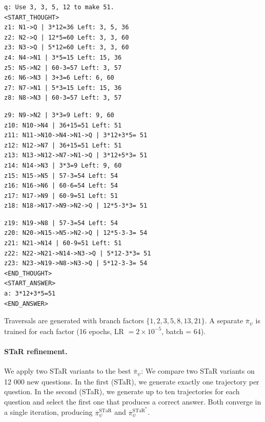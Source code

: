 \documentclass{article}
\begin{document}
\noindent
\begin{minipage}[t]{0.3\textwidth}
\scriptsize{
\begin{verbatim}
q: Use 3, 3, 5, 12 to make 51.
<START_THOUGHT>
z1: N1->Q | 3*12=36 Left: 3, 5, 36
z2: N2->Q | 12*5=60 Left: 3, 3, 60
z3: N3->Q | 5*12=60 Left: 3, 3, 60
z4: N4->N1 | 3*5=15 Left: 15, 36
z5: N5->N2 | 60-3=57 Left: 3, 57
z6: N6->N3 | 3+3=6 Left: 6, 60
z7: N7->N1 | 5*3=15 Left: 15, 36
z8: N8->N3 | 60-3=57 Left: 3, 57
\end{verbatim}}
\end{minipage}
\hfill
\begin{minipage}[t]{0.34\textwidth}
\scriptsize{
\begin{verbatim}
z9: N9->N2 | 3*3=9 Left: 9, 60
z10: N10->N4 | 36+15=51 Left: 51
z11: N11->N10->N4->N1->Q | 3*12+3*5= 51
z12: N12->N7 | 36+15=51 Left: 51
z13: N13->N12->N7->N1->Q | 3*12+5*3= 51
z14: N14->N3 | 3*3=9 Left: 9, 60
z15: N15->N5 | 57-3=54 Left: 54
z16: N16->N6 | 60-6=54 Left: 54
z17: N17->N9 | 60-9=51 Left: 51
z18: N18->N17->N9->N2->Q | 12*5-3*3= 51
\end{verbatim}}
\end{minipage}
\hfill
\begin{minipage}[t]{0.3\textwidth}
\scriptsize{
\begin{verbatim}
z19: N19->N8 | 57-3=54 Left: 54
z20: N20->N15->N5->N2->Q | 12*5-3-3= 54
z21: N21->N14 | 60-9=51 Left: 51
z22: N22->N21->N14->N3->Q | 5*12-3*3= 51
z23: N23->N19->N8->N3->Q | 5*12-3-3= 54
<END_THOUGHT>
<START_ANSWER>
a: 3*12+3*5=51
<END_ANSWER>
\end{verbatim}}
\end{minipage}
\newline

Traversals are generated with branch factors
$\{1,2,3,5,8,13,21\}$.
A separate $\overline{\pi}_\psi$ is trained for each
factor (16 epochs, LR $=2\!\times\!10^{-5}$, batch = 64).

\paragraph{STaR refinement.}
We apply two STaR variants to the best
$\overline{\pi}_\psi$:
We compare two STaR variants on 12 000 new questions. In the first (STaR), we generate exactly one trajectory per question. In the second (STaR\*), we generate up to ten trajectories for each question and select the first one that produces a correct answer. Both converge in a single iteration, producing
$\overline{\pi}_\psi^{\text{STaR}}$ and
$\overline{\pi}_\psi^{\text{STaR}^\ast}$.
\end{document}
